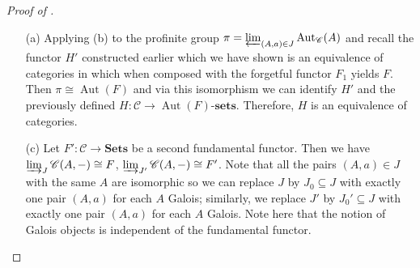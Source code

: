 \documentclass[10pt]{article}
\theoremstyle{thmstyle}
\theoremstyle{defstyle}
\newcommand{\catSets}{\mathbf{Sets}}
\newcommand{\sets}[1]{#1\text{-}\mathbf{sets}}
\newcommand{\Aut}{\operatorname{Aut}}
\newcommand{\id}{\mathbf{id}}
\newcommand{\scrC}{\mathscr{C}} %
\begin{document}
\begin{proof}[Proof of ]
\begin{enumerate}
\begin{equation*}
{    }
\end{equation*}
Then, we can define $\varphi(\sigma)\coloneq\left(\varphi(\sigma)_A\right)_{A\in\sets{\pi}} = \left(F_1(\theta_A^{-1})\sigma_{G(A)}F_1(\theta_A)\right)_A$. We contend that $\varphi(\sigma)$ is an automorphism of functors. Indeed, $F_1(g) = F_1(\theta^{-1}_B\circ HG(g)\circ\theta_A)$ by the diagram of the equivalence of categories. Then 
\begin{equation*}
    F_1(g)\circ\varphi(\sigma)_A = F_1\left(\theta_B^{-1}\circ HG(g)\circ\theta_A\right)F_1(\theta_A^{-1})\sigma_{G(A)}F_1(\theta_A) = F_1(\theta_B^{-1})\circ F_1(HG(g))\circ\sigma_{G(A)}\circ F_1(\theta_A),
\end{equation*}
and similarly, 
\begin{equation*}
    \varphi(\sigma)_BF_1(g) = F_1(\theta_B^{-1})\circ\sigma_{G(B)}\circ F_1(HG(g))\circ F_1(\theta_A).
\end{equation*}
Using that $\sigma$ is a natural transformation, we have that $\sigma_{G(B)}F_1HG(g) = F_1HG(g)\sigma_{G(A)}$, and so $F_1(g)\circ\varphi(\sigma)_A = \varphi(\sigma)_B\circ F_1(g)$ and hence $\varphi(\sigma)$ is a well-defined automorphism of the functor $F_1$.

It remains to show that $\varphi\psi$ and $\psi\varphi$ are identities. Let $\sigma\in\Aut(F)$, then 
\begin{equation*}
    \psi\varphi(\sigma) = \left(\psi\varphi(\sigma)_X\right)_X = \left(F_1(\theta^{-1}_{H(X)})\sigma_{GH(X)}F_1(\theta_{H(X)})\right).
\end{equation*}
As $\sigma$ is a natural isomorphism, it commutes with the morphism $\theta_{H(X)}$, and hence $\sigma_{GH(X)}F_1(\theta_{H(X)}) = F_1(\theta_{H(X)})\sigma_X$, and therefore $\psi\varphi(\sigma)_X = \sigma_X$, i.e., $\psi\varphi(\sigma) = \id_{\Aut(F)}$. Similarly, one can show that $\varphi\psi = \id_{\Aut(F_1)}$. This completes the proof of (b).

\item[(a)] Applying (b) to the profinite group $\pi = \varprojlim_{(A, a)\in J}\Aut_{\scrC}(A)$ and recall the functor $H'$ constructed earlier which we have shown is an equivalence of categories in  which when composed with the forgetful functor $F_1$ yields $F$. Then $\pi\cong\Aut(F)$ and via this isomorphism we can identify $H'$ and the previously defined $H:\scrC\to\sets{\Aut(F)}$. Therefore, $H$ is an equivalence of categories.

\item[(c)] Let $F':\scrC\to\catSets$ be a second fundamental functor. Then we have $\varinjlim_J\scrC(A, -)\cong F$, $\varinjlim_{J'}\scrC(A, -)\cong F'$. Note that all the pairs $(A, a)\in J$ with the same $A$ are isomorphic so we can replace $J$ by $J_0\subseteq J$ with exactly one pair $(A, a)$ for each $A$ Galois; similarly, we replace $J'$ by $J_0'\subseteq J$ with exactly one pair $(A, a)$ for each $A$ Galois. Note here that the notion of Galois objects is independent of the fundamental functor. 


\end{enumerate}
\end{proof}
\end{document}
